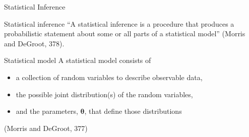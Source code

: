 \documentclass[10pt]{beamer}
\begin{document}

\begin{frame}[fragile]{Statistical Inference}

\begin{block}{Statistical inference}
``A statistical inference is a procedure that produces a probabilistic statement about some or all parts of a statistical model'' (Morris and DeGroot, 378).
\end{block}

\vfill

\begin{block}{Statistical model}
A statistical model consists of

\begin{itemize}
\item a collection of random variables to describe observable data,
\item the possible joint distribution(s) of the random variables,
\item and the parameters, $\boldsymbol \theta$, that define those distributions
\end{itemize}

(Morris and DeGroot, 377)

\end{block}

\end{frame}
\end{document}
